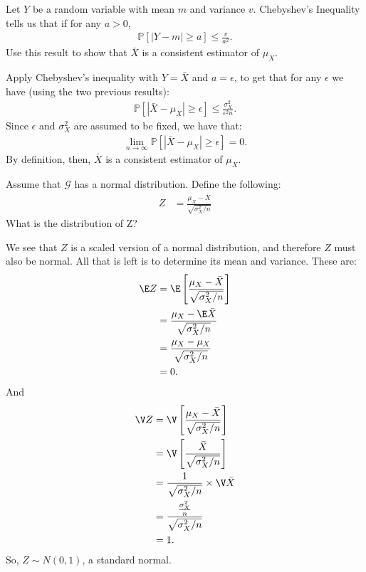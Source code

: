 
Let $Y$ be a random variable with mean $m$ and variance $v$. Chebyshev's
Inequality tells us that if for any $a > 0$,
\begin{align*}
\mathbb{P}[ |Y - m| \geq a] \leq \frac{v}{a^2}.
\end{align*}
Use this result to show that $\bar{X}$ is a consistent estimator of $\mu_X$.


Apply Chebyshev's inequality with $Y = \bar{X}$ and $a = \epsilon$, to get
that for any $\epsilon$ we have (using the two previous results):
\begin{align*}
\mathbb{P}[ |\bar{X} - \mu_X| \geq \epsilon] \leq \frac{\sigma_X^2}{\epsilon^2 n}.
\end{align*}
Since $\epsilon$ and $\sigma_X^2$ are assumed to be fixed, we have that:
\begin{align*}
\lim_{n\rightarrow \infty} \mathbb{P}[ |\bar{X} - \mu_X| \geq \epsilon] = 0.
\end{align*}
By definition, then, $\bar{X}$ is a consistent estimator of $\mu_X$.


Assume that $\mathcal{G}$ has a normal distribution. Define the following:
\begin{align*}
Z &= \frac{\mu_X - \bar{X}}{\sqrt{\sigma_X^2 / n}}
\end{align*}
What is the distribution of Z?


We see that $Z$ is a scaled version of a normal distribution, and therefore
$Z$ must also be normal. All that is left is to determine its mean and variance.
These are:
\begin{align*}
\E Z &= \E \left[ \frac{\mu_X - \bar{X}}{\sqrt{\sigma_X^2 / n}} \right] \\
&= \frac{\mu_X - \E\bar{X}}{\sqrt{\sigma_X^2 / n}} \\
&= \frac{\mu_X - \mu_X}{\sqrt{\sigma_X^2 / n}} \\
&= 0.
\end{align*}
And 
\begin{align*}
\V Z &= \V \left[ \frac{\mu_X - \bar{X}}{\sqrt{\sigma_X^2 / n}} \right] \\
&= \V \left[ \frac{\bar{X}}{\sqrt{\sigma_X^2 / n}} \right] \\
&= \frac{1}{\sqrt{\sigma_X^2 / n}} \times \V \bar{X} \\
&= \frac{\frac{\sigma_X^2}{n}}{\sqrt{\sigma_X^2 / n}} \\
&= 1.
\end{align*}
So, $Z \sim N(0, 1)$, a standard normal.